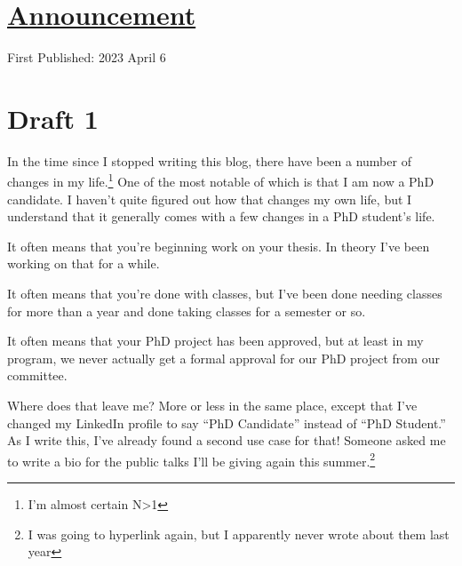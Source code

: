 \documentclass[12pt]{article}[titlepage]
\newcommand{\say}[1]{``#1''}
\newcommand{\1}{\={a}}
\newcommand{\2}{\={e}}
\newcommand{\3}{\={\i}}
\newcommand{\4}{\=o}
\newcommand{\5}{\=u}
\newcommand{\6}{\={A}}
\renewcommand{\,}{\textsuperscript{,}}
\begin{document}
\doublespacing
\section{\href{candidate.html}{Announcement}}
First Published: 2023 April 6

\section{Draft 1}
In the time since I stopped writing this blog, there have been a number of changes in my life.\footnote{I'm almost certain N>1}
One of the most notable of which is that I am now a PhD candidate.
I haven't quite figured out how that changes my own life, but I understand that it generally comes with a few changes in a PhD student's life.

It often means that you're beginning work on your thesis.
In theory I've been working on that for a while.

It often means that you're done with classes, but I've been done needing classes for more than a year and done taking classes for a semester or so.

It often means that your PhD project has been approved, but at least in my program, we never actually get a formal approval for our PhD project from our committee.

Where does that leave me?
More or less in the same place, except that I've changed my LinkedIn profile to say \say{PhD Candidate} instead of \say{PhD Student.}
As I write this, I've already found a second use case for that!
Someone asked me to write a bio for the public talks I'll be giving again this summer.\footnote{I was going to hyperlink again, but I apparently never wrote about them last year}
\end{document}
